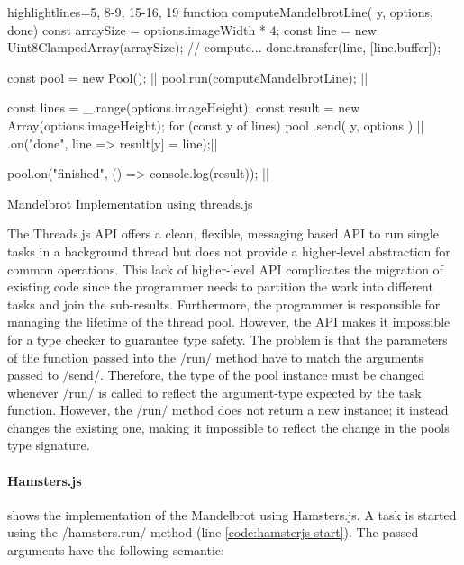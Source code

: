 \begin{listing}
	\begin{javascriptcode*}{highlightlines={5, 8-9, 15-16, 19}}
function computeMandelbrotLine({ y, options}, done) {
	const arraySize = options.imageWidth * 4;
	const line = new Uint8ClampedArray(arraySize);
	// compute...
	done.transfer(line, [line.buffer]);
}

const pool = new Pool(); |$\label{code:threadsjs-pool}$|
pool.run(computeMandelbrotLine); |$\label{code:threadsjs-worker}$|

const lines = _.range(options.imageHeight);
const result = new Array(options.imageHeight);
for (const y of lines) {
	pool
		.send({ y, options }) |$\label{code:threadsjs-messaging}$|
		.on("done", line => result[y] = line);|$\label{code:threadsjs-task-completion}$|
}

pool.on("finished", () => console.log(result)); |$\label{code:threadsjs-done}$|
\end{javascriptcode*}
\caption{Mandelbrot Implementation using threads.js}
\label{fig:mandelbrot-threadsjs}
\end{listing}


The Threads.js API offers a clean, flexible, messaging based API to run single tasks in a background thread but does not provide a higher-level abstraction for common operations. This lack of higher-level API complicates the migration of existing code since the programmer needs to partition the work into different tasks and join the sub-results. Furthermore, the programmer is responsible for managing the lifetime of the thread pool. However, the API makes it impossible for a type checker to guarantee type safety. The problem is that the parameters of the function passed into the \javascriptinline/run/ method have to match the arguments passed to \javascriptinline/send/. Therefore, the type of the pool instance must be changed whenever \javascriptinline/run/ is called to reflect the argument-type expected by the task function. However, the \javascriptinline/run/ method does not return a new instance; it instead changes the existing one, making it impossible to reflect the change in the pools type signature.

\paragraph{Hamsters.js}
 shows the implementation of the Mandelbrot using Hamsters.js. A task is started using the \javascriptinline/hamsters.run/ method (line \ref{code:hamsterjs-start}). The passed arguments have the following semantic:

